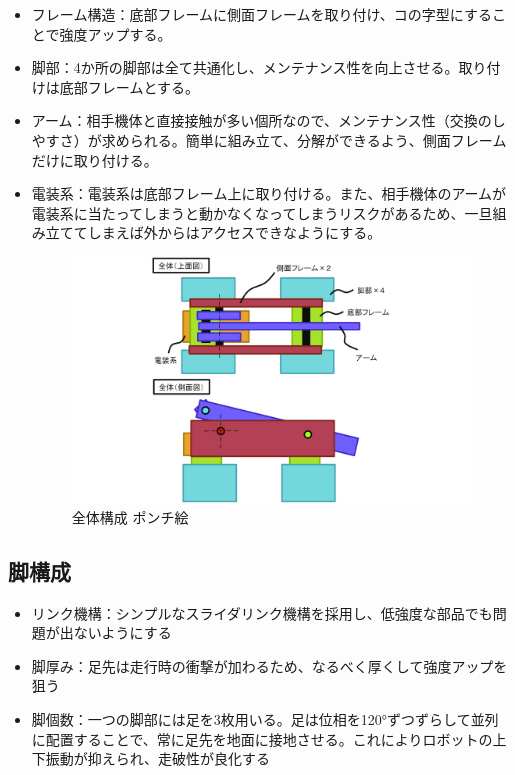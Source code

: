 \begin{itemize}
\tightlist
\item
  フレーム構造：底部フレームに側面フレームを取り付け、コの字型にすることで強度アップする。
\item
  脚部：4か所の脚部は全て共通化し、メンテナンス性を向上させる。取り付けは底部フレームとする。
\item
  アーム：相手機体と直接接触が多い個所なので、メンテナンス性（交換のしやすさ）が求められる。簡単に組み立て、分解ができるよう、側面フレームだけに取り付ける。
\item
  電装系：電装系は底部フレーム上に取り付ける。また、相手機体のアームが電装系に当たってしまうと動かなくなってしまうリスクがあるため、一旦組み立ててしまえば外からはアクセスできなようにする。
  　\\

  \begin{figure}[htbp]
  \centering
  \includegraphics[width=380pt]{fig/fig01_cmyk.jpg}
  \caption{全体構成 ポンチ絵}
  \label{fig01}
  \end{figure}
\end{itemize}

\subsection{脚構成}\label{ux811aux69cbux6210}

\begin{itemize}
\tightlist
\item
  リンク機構：シンプルなスライダリンク機構を採用し、低強度な部品でも問題が出ないようにする
\item
  脚厚み：足先は走行時の衝撃が加わるため、なるべく厚くして強度アップを狙う
\item
  脚個数：一つの脚部には足を3枚用いる。足は位相を120°ずつずらして並列に配置することで、常に足先を地面に接地させる。これによりロボットの上下振動が抑えられ、走破性が良化する
\end{itemize}

